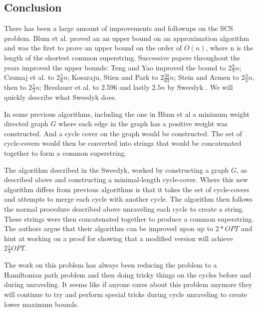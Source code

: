 \documentclass[letterpaper,11pt,titlepage]{article}
\begin{document}
\subsection*{Conclusion}
There has been a large amount of improvements and followups on the SCS problem. Blum et al. proved an an upper bound on an approximation algorithm and was the first to prove an upper bound on the order of $O(n)$, where n is the length of the shortest common superstring. Successive papers throughout the years improved the upper bounds: Teng and Yao improved the bound to $2 \frac{8}{9} n$; Czumaj et al. to $2 \frac{5}{6} n$; Kosaraju, Stien and Park to $2 \frac{50}{63} n$; Stein and Armen to $2 \frac{3}{4} n$, then to $2 \frac{2}{3} n$; Breslauer et al. to 2.596 and lastly $2.5 n$ by Sweedyk \cite{sweedyk2000boldmath}. We will quickly describe what Sweedyk does.

In some previous algorithms, including the one in Blum et al a minimum weight directed graph $G$ where each edge in the graph has a positive weight was constructed. And a cycle cover on the graph would be constructed. The set of cycle-covers would then be converted into strings that would be concatenated together to form a common superstring.

The algorithm described in the Sweedyk, worked by constructing a graph $G$, as described above and constructing a minimal-length cycle-cover. Where this new algorithm differs from previous algorithms is that it takes the set of cycle-covers and attempts to merge each cycle with another cycle. 
The algorithm then follows the normal procedure described above unraveling each cycle to create a string. These strings were then concatenated together to produce a common superstring. The authors argue that their algorithm can be improved upon up to $2 * OPT$ and hint at working on a proof for showing that a modified version will achieve $2\frac{1}{3} OPT$.

The work on this problem has always been reducing the problem to a Hamiltonian path problem and then doing tricky things on the cycles before and during unraveling. It seems like if anyone cares about this problem anymore they will continue to try and perform special tricks during cycle unraveling to create lower maximum bounds.

\newpage

{
  \small 
  
  
}
\end{document}
